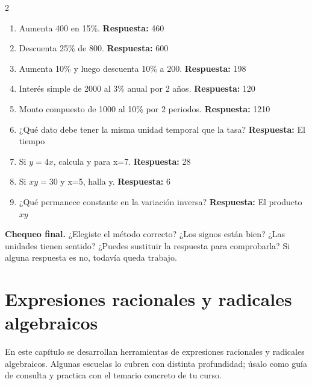\documentclass[10pt,oneside,openany]{book}
\begin{document}
\begin{multicols}{2}\begin{enumerate}

\item Aumenta \textdollar{}400 en 15\%. \textbf{Respuesta:} \textdollar{}460

\item Descuenta 25\% de \textdollar{}800. \textbf{Respuesta:} \textdollar{}600

\item Aumenta 10\% y luego descuenta 10\% a \textdollar{}200. \textbf{Respuesta:} \textdollar{}198

\item Interés simple de \textdollar{}2000 al 3\% anual por 2 años. \textbf{Respuesta:} \textdollar{}120

\item Monto compuesto de \textdollar{}1000 al 10\% por 2 periodos. \textbf{Respuesta:} \textdollar{}1210

\item ¿Qué dato debe tener la misma unidad temporal que la tasa? \textbf{Respuesta:} El tiempo

\item Si $y=4x$, calcula y para x=7. \textbf{Respuesta:} 28

\item Si $xy=30$ y x=5, halla y. \textbf{Respuesta:} 6

\item ¿Qué permanece constante en la variación inversa? \textbf{Respuesta:} El producto $xy$

\end{enumerate}\end{multicols}

\begin{idea}\textbf{Chequeo final.} ¿Elegiste el método correcto? ¿Los signos están bien? ¿Las unidades tienen sentido? ¿Puedes sustituir la respuesta para comprobarla? Si alguna respuesta es no, todavía queda trabajo.\end{idea}



\chapter{Expresiones racionales y radicales algebraicos}

\begin{idea}
En este capítulo se desarrollan herramientas de expresiones racionales y radicales algebraicos. Algunas escuelas lo cubren con distinta profundidad; úsalo como guía de consulta y practica con el temario concreto de tu curso.
\end{idea}
\end{document}
